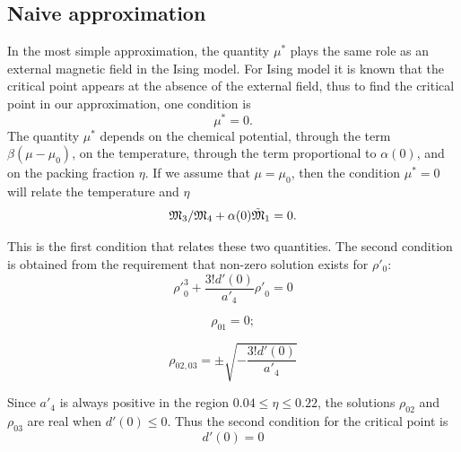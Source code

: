 \subsection{Naive approximation}
In the most simple approximation, the quantity $\mu^*$ plays the same role as an external magnetic field in the Ising model. For Ising model it is known that the critical point appears at the absence of the external field, thus to find the critical point in our approximation, one condition is 
$$\mu^*=0.$$ 
The quantity $\mu^*$ depends on the chemical potential, through the term $\beta(\mu - \mu_0)$, on the temperature, through the term proportional to $\alpha(0)$, and on the packing fraction $\eta.$
If we assume that $\mu = \mu_0$, then the condition $\mu^*=0$ will relate the temperature and $\eta$
$$
{\frak M_3}/{\frak M_4} + \alpha(0)\tilde{\frak M}_1 = 0.
$$


This is the first condition that relates these two quantities.
The second condition is obtained from the requirement that non-zero solution exists for $\rho'_0$:
$$ {\rho'}^3_0 + \frac{3!d'(0)}{a'_4}{\rho'}_0 = 0 $$

$$
\rho_{01} = 0;
$$ 

$$
\rho_{02,03} = \pm\sqrt{-\frac{3!d'(0)}{a'_4}}
$$

Since $a'_4$ is always positive in the region $0.04 \leq \eta \leq 0.22$, the solutions $\rho_{02}$ and $\rho_{03}$ are real when $d'(0) \leq 0$. Thus the second condition for the critical point is 
$$
d'(0) = 0
$$

